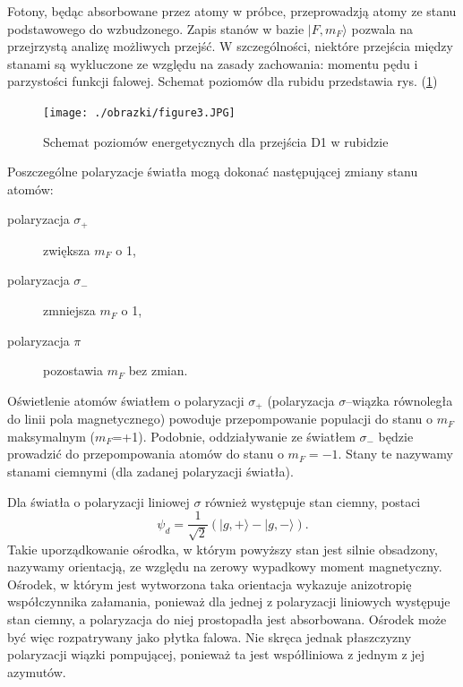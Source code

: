 \documentclass[a4paper,10pt]{article}
\begin{document}
Fotony, będąc absorbowane przez atomy w próbce, przeprowadzją atomy ze stanu podstawowego do wzbudzonego.
Zapis stanów w bazie $|F,m_F\rangle$ pozwala na przejrzystą analizę możliwych przejść.
W szczególności, niektóre przejścia między stanami są wykluczone ze względu na zasady zachowania: momentu pędu i parzystości funkcji falowej. Schemat poziomów dla rubidu przedstawia rys. (\ref{poziomyRb})


\begin{figure}
\begin{center}
 \texttt{[image: ./obrazki/figure3.JPG]}
\end{center}
\caption{Schemat poziomów energetycznych dla przejścia D1 w rubidzie}
\label{poziomyRb}
\end{figure}

Poszczególne polaryzacje światła mogą dokonać następującej zmiany stanu atomów:
\begin{center}
\begin{description}
\item[polaryzacja $\sigma_+$] zwiększa $m_F$ o 1,
\item[polaryzacja $\sigma_-$] zmniejsza $m_F$ o 1,
\item[polaryzacja $\pi$] pozostawia $m_F$ bez zmian.
\end{description}
\end{center}

Oświetlenie atomów światłem o polaryzacji $\sigma_+$ (polaryzacja $\sigma$--wiązka równoległa do linii pola magnetycznego) powoduje przepompowanie populacji do stanu o $m_F$ maksymalnym ($m_F$=+1). Podobnie, oddziaływanie ze światłem $\sigma_-$ będzie prowadzić do przepompowania atomów do stanu o $m_F=-1$. Stany te nazywamy stanami ciemnymi (dla zadanej polaryzacji światła).

Dla światła o polaryzacji liniowej $\sigma$ również występuje stan ciemny, postaci $$\psi_d=\frac{1}{\sqrt{2}} (|g,+\rangle-|g,-\rangle).$$ Takie uporządkowanie ośrodka, w którym powyższy stan jest silnie obsadzony, nazywamy orientacją, ze względu na zerowy wypadkowy moment magnetyczny. Ośrodek, w którym jest wytworzona taka orientacja wykazuje anizotropię współczynnika załamania, ponieważ dla jednej z polaryzacji liniowych występuje stan ciemny, a polaryzacja do niej prostopadła jest absorbowana. Ośrodek może być więc rozpatrywany jako płytka falowa. Nie skręca jednak płaszczyzny polaryzacji wiązki pompującej, ponieważ ta jest współliniowa z jednym z jej azymutów.
\end{document}
